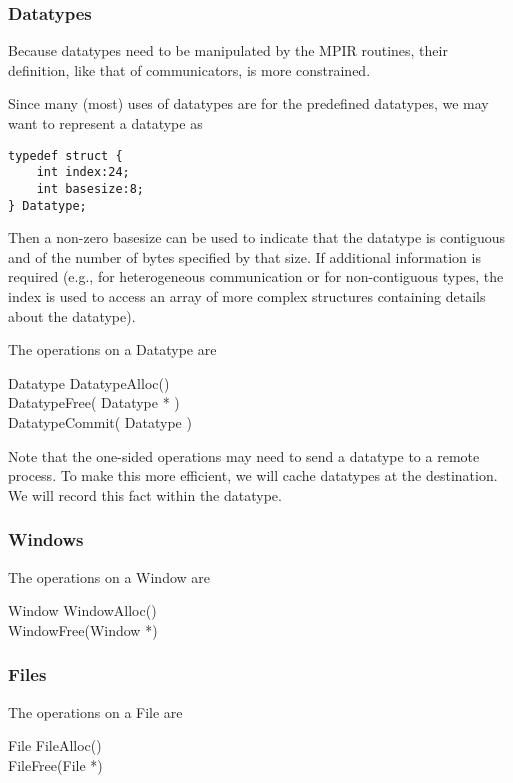 \documentclass{article}
\begin{document}
\subsubsection{Datatypes}
Because datatypes need to be manipulated by the MPIR routines, their
definition, like that of communicators, is more constrained.

Since many (most) uses of datatypes are for the predefined datatypes, we may
want to represent a datatype as 
\begin{verbatim}
typedef struct {
    int index:24;
    int basesize:8;
} Datatype;
\end{verbatim}
Then a non-zero basesize can be used to indicate that the datatype is
contiguous and of the number of bytes specified by that size.  If additional
information is required (e.g., for heterogeneous communication or for
non-contiguous types, the index is used to access an array of more complex
structures containing details about the datatype).

The operations on a Datatype are
\begin{description}
\item[Datatype DatatypeAlloc()]
\item[DatatypeFree( Datatype * )]
\item[DatatypeCommit( Datatype )]
\end{description}

Note that the one-sided operations may need to send a datatype to a remote
process.  To make this more efficient, we will cache datatypes at the
destination.  We will record this fact within the datatype.

\subsubsection{Windows}

The operations on a Window are
\begin{description}
\item[Window WindowAlloc()]
\item[WindowFree(Window *)]
\end{description}


\subsubsection{Files}

The operations on a File are
\begin{description}
\item[File FileAlloc()]
\item[FileFree(File *)]
\end{description}
\end{document}

